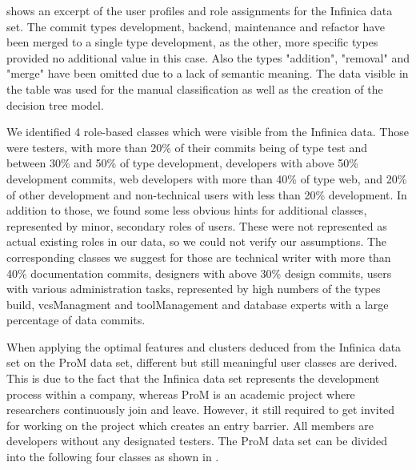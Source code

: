  shows an excerpt of the user profiles and role assignments for the Infinica data set. The commit types development, backend, maintenance and refactor have been merged to a single type development, as the other, more specific types provided no additional value in this case. Also the types "addition", "removal" and "merge" have been omitted due to a lack of semantic meaning. The data visible in the table was used for the manual classification as well as the creation of the decision tree model.



We identified 4 role-based classes which were visible from the Infinica data. Those were testers, with more than 20\% of their commits being of type test and between 30\% and 50\% of type development, developers with above 50\% development commits, web developers with more than 40\% of type web, and 20\% of other development and non-technical users with less than 20\% development. In addition to those, we found some less obvious hints for additional classes, represented by minor, secondary roles of users. These were not represented as actual existing roles in our data, so we could not verify our assumptions. The corresponding classes we suggest for those are technical writer with more than 40\% documentation commits, designers with above 30\% design commits, users with various administration tasks, represented by high numbers of the types build, vcsManagment and toolManagement and database experts with a large percentage of data commits.

When applying the optimal features and clusters deduced from the Infinica data set on the ProM data set, different but still meaningful user classes are derived. This is due to the fact that the Infinica data set represents the development process within a company, whereas ProM is an academic project where researchers continuously join and leave. However, it still required to get invited for working on the project which creates an entry barrier. All members are developers without any designated testers. The ProM data set can be divided into the following four classes as shown in .

